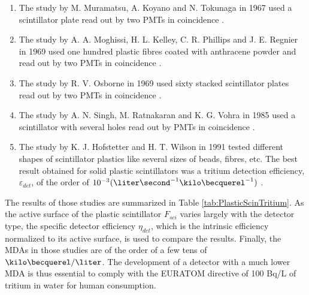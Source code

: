 \begin{enumerate}

\item{} The study by M. Muramatsu, A. Koyano and N. Tokunaga in 1967 used a scintillator plate read out by two PMTs in coincidence \cite{Muramatsu}.

\item{} The study by A. A. Moghissi, H. L. Kelley, C. R. Phillips and J. E. Regnier in 1969 used one hundred plastic fibres coated with anthracene powder and read out by two PMTs in coincidence \cite{Moghissi}.

\item{} The study by R. V. Osborne in 1969 used sixty stacked scintillator plates read out by two PMTs in coincidence \cite{Osborne}.

\item{} The study by A. N. Singh, M. Ratnakaran and K. G. Vohra in 1985 used a scintillator with several holes read out by PMTs in coincidence \cite{Ratnakaran, Ratnakaran2000}.

\item{} The study by K. J. Hofstetter and H. T. Wilson in 1991 tested different shapes of scintillator plastics like several sizes of beads, fibres, etc. The best result obtained for solid plastic scintillators was a tritium detection efficiency, $\varepsilon_{det}$, of the order of $10^{-3}(\liter\second^{-1}\kilo\becquerel^{-1})$ \cite{Hofstetter1, Hofstetter2}.

\end{enumerate}

The results of those studies are summarized in Table \ref{tab:PlasticScinTritium}. As the active surface of the plastic scintillator $F_{sci}$ varies largely with the detector type, the specific detector efficiency $\eta_{det}$, which is the intrinsic efficiency normalized to its active surface, is used to compare the results. Finally, the MDAs in those studies are of the order of a few tens of $\kilo\becquerel/\liter$. The development of a detector with a much lower MDA is thus essential to comply with the EURATOM directive of 100 Bq/L of tritium in water for human consumption.

